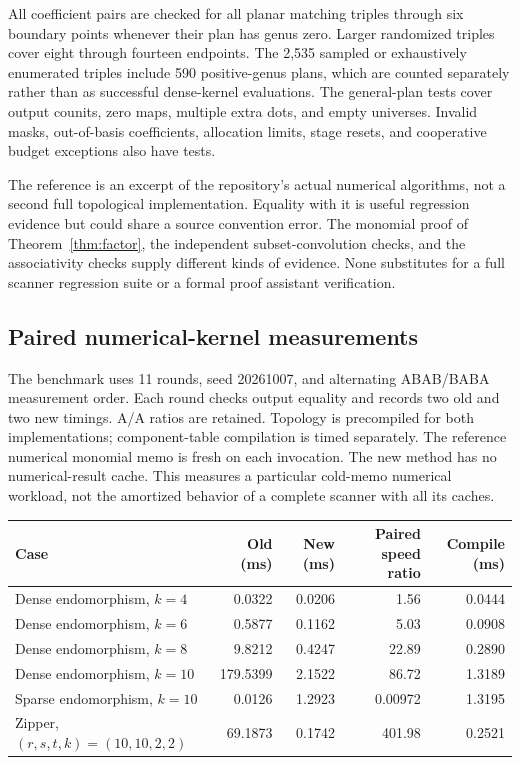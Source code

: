 \documentclass[11pt,letterpaper]{article}
\theoremstyle{definition}
\theoremstyle{remark}
\begin{document}
All coefficient pairs are checked for all planar matching triples through
six boundary points whenever their plan has genus zero. Larger randomized
triples cover eight through fourteen endpoints. The 2,535 sampled or
exhaustively enumerated triples include 590 positive-genus plans, which
are counted separately rather than as successful dense-kernel evaluations.
The general-plan tests cover output counits, zero maps, multiple extra dots,
and empty universes. Invalid masks, out-of-basis coefficients, allocation
limits, stage resets, and cooperative budget exceptions also have tests.

The reference is an excerpt of the repository's actual numerical
algorithms, not a second full topological implementation. Equality with it
is useful regression evidence but could share a source convention error.
The monomial proof of Theorem~\ref{thm:factor}, the independent
subset-convolution checks, and the associativity checks supply different
kinds of evidence. None substitutes for a full scanner regression suite or
a formal proof assistant verification.

\subsection{Paired numerical-kernel measurements}
The benchmark uses 11 rounds, seed 20261007, and alternating ABAB/BABA
measurement order. Each round checks output equality and records two old
and two new timings. A/A ratios are retained. Topology is precompiled for
both implementations; component-table compilation is timed separately.
The reference numerical monomial memo is fresh on each invocation. The
new method has no numerical-result cache. This measures a particular
cold-memo numerical workload, not the amortized behavior of a complete
scanner with all its caches.

\begin{center}
\small
\begin{tabular}{lrrrr}
\toprule
Case & Old (ms) & New (ms) & Paired speed ratio & Compile (ms)\\
\midrule
Dense endomorphism, $k=4$  & 0.0322 & 0.0206 & 1.56 & 0.0444\\
Dense endomorphism, $k=6$  & 0.5877 & 0.1162 & 5.03 & 0.0908\\
Dense endomorphism, $k=8$  & 9.8212 & 0.4247 & 22.89 & 0.2890\\
Dense endomorphism, $k=10$ & 179.5399 & 2.1522 & 86.72 & 1.3189\\
Sparse endomorphism, $k=10$ & 0.0126 & 1.2923 & 0.00972 & 1.3195\\
Zipper, $(r,s,t,k)=(10,10,2,2)$ & 69.1873 & 0.1742 & 401.98 & 0.2521\\
\bottomrule
\end{tabular}
\end{center}
\end{document}
